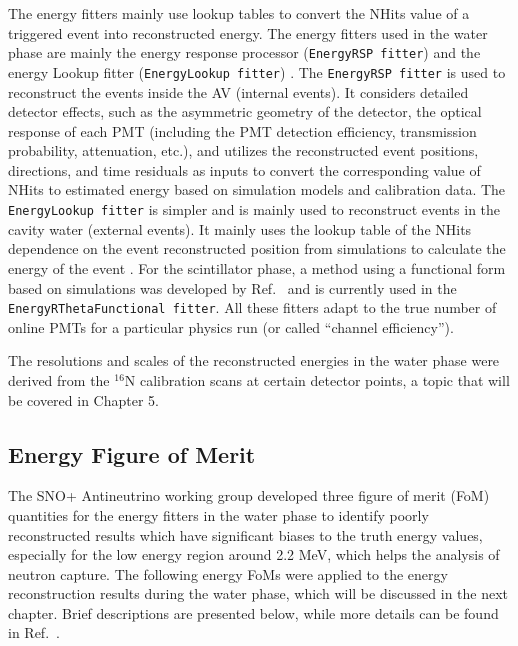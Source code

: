 The energy fitters mainly use lookup tables to convert the NHits value of a triggered event into reconstructed energy. The energy fitters used in the water phase are mainly the energy response processor (\texttt{EnergyRSP fitter}) \cite{walker2016study,boulay2004direct,moffat2001optical} and the energy Lookup fitter (\texttt{EnergyLookup fitter}) \cite{jones2011background,energyFunctional}. The \texttt{EnergyRSP fitter} is used to reconstruct the events inside the AV (internal events). It considers detailed detector effects, such as the asymmetric geometry of the detector, the optical response of each PMT (including the PMT detection efficiency, transmission probability, attenuation, etc.), and utilizes the reconstructed event positions, directions, and time residuals as inputs to convert the corresponding value of NHits to estimated energy based on simulation models and calibration data. The \texttt{EnergyLookup fitter} is simpler and is mainly used to reconstruct events in the cavity water (external events). It mainly uses the lookup table of the NHits dependence on the event reconstructed position from simulations to calculate the energy of the event \cite{jones2011background}. For the scintillator phase, a method using a functional form based on simulations was developed by Ref.~\cite{energyFunctional,energyRThetaFunctional} and is currently used in the \texttt{EnergyRThetaFunctional fitter}. All these fitters adapt to the true number of online PMTs for a particular physics run (or called ``channel efficiency''). 

The resolutions and scales of the reconstructed energies in the water phase were derived from the $^{16}$N calibration scans at certain detector points, a topic that will be covered in Chapter 5.

\subsection{Energy Figure of Merit}\label{sect:energy_fom}

The SNO+ Antineutrino working group developed three figure of merit (FoM) quantities for the energy fitters in the water phase to identify poorly reconstructed results which have significant biases to the truth energy values, especially for the low energy region around 2.2 MeV, which helps the analysis of neutron capture\cite{waterFoM,waterunidoc}. The following energy FoMs were applied to the energy reconstruction results during the water phase, which will be discussed in the next chapter. Brief descriptions are presented below, while more details can be found in Ref.~\cite{waterunidoc}.

